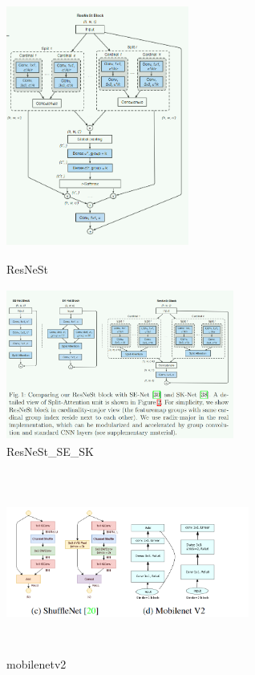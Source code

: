 \documentclass[UTF8]{ctexart}
\begin{document}
\begin{figure}[htbp]
	\centering
	\begin{minipage}[t]{0.48\textwidth}
	\centering
	\includegraphics[width=6cm,height=8cm]{./pic/ResNeSt.png}
	\caption{ResNeSt}
	\label{picresnest}
	\end{minipage}
	\begin{minipage}[t]{0.48\textwidth}
		\centering
		\includegraphics[width=7.5cm,height=5cm]{./pic/ResNeSt_SE_Sk.png}
		\caption{ResNeSt\_SE\_SK}
		\label{picresnest_se_sk}
	\end{minipage}
\end{figure}


\begin{figure}[htbp]
	\centering
	\includegraphics[width=8cm,height=6cm]{./pic/MobileNetV2.png}
	\caption{mobilenetv2}
	\label{picmobilenet}
\end{figure}
\end{document}
